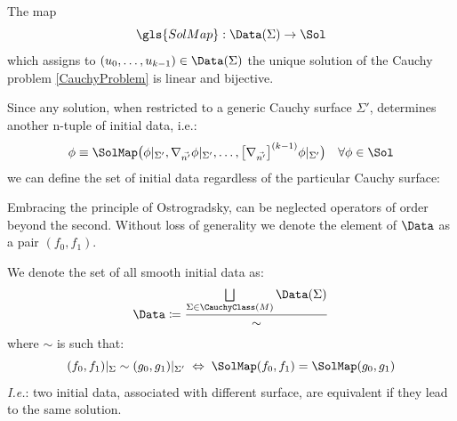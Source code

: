 \documentclass[Main]{subfiles}
\begin{document}
			\begin{corollary}
				The map $$ 	 \gls{SolMap} : \Data (\Sigma ) \rightarrow \Sol $$ which assigns to $(u_0, \ldots, u_{k-1})\in \Data(\Sigma)$ the unique solution of the Cauchy problem \ref{CauchyProblem} is linear and bijective.
			\end{corollary}
			
			Since any solution, when restricted to a generic Cauchy surface $\Sigma'$, determines another n-tuple of initial data, i.e.:
			\begin{displaymath}
				\phi \equiv \SolMap \big(\phi \vert_{\Sigma'}, \nabla_{\vec{n'}}\phi\vert_{\Sigma'}, \ldots, 
				\big[\nabla_{\vec{n'}}\big]^{(k-1)}\phi \vert_{\Sigma'} \big)	\quad \forall \phi\in \Sol
			\end{displaymath}						
			we can define the set of initial data regardless of the particular Cauchy surface:			

			\begin{NB}
			
				Embracing the principle of Ostrogradsky, can be neglected operators of order	beyond the second.
				Without loss of generality we denote the element of $\Data$ as a pair $(f_0,f_1)$.
			\end{NB}			
			
			\begin{definition}\label{Def:DataSenzaSup}
				We denote the set of all smooth initial data as:
				\begin{displaymath}
					\Data  \coloneqq \frac{\bigsqcup\limits_{\Sigma \in \CauchyClass(M)}\Data(\Sigma)}{\sim} 
				\end{displaymath}
				where $\sim$ is such that:
				\begin{displaymath}
					(f_0, f_1)|_\Sigma \sim (g_0, g_1)|_{\Sigma'} \; \Leftrightarrow \; \SolMap(f_0,f_1) =  \SolMap(g_0,g_1) 
				\end{displaymath}
				\textit{I.e.}: two initial data, associated with different surface, are equivalent if they lead to the same solution.
			\end{definition}
			
\end{document}
